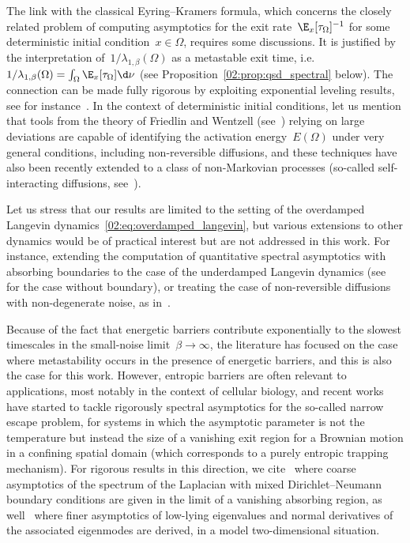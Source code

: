     The link with the classical Eyring--Kramers formula, which concerns the closely related problem of computing asymptotics for the exit rate~$\E_x[\tau_\Omega]^{-1}$ for some deterministic initial condition~$x\in\Omega$, requires some discussions. It is justified by the interpretation of~$1/\lambda_{1,\beta}(\Omega)$ as a metastable exit time, i.e.~$1/\lambda_{1,\beta}(\Omega) = \int_{\Omega} \E_x[\tau_\Omega]\d \nu$ (see Proposition~\ref{02:prop:qsd_spectral} below). The connection can be made fully rigorous by exploiting exponential leveling results, see for instance~\cite{N20}.
    In the context of deterministic initial conditions, let us mention that tools from the theory of Friedlin and Wentzell (see~\cite{FW12}) relying on large deviations are capable of identifying the activation energy~$E(\Omega)$ under very general conditions, including non-reversible diffusions, and these techniques have also been recently extended to a class of non-Markovian processes (so-called self-interacting diffusions, see~\cite{ADMKT24}).

    Let us stress that our results are limited to the setting of the overdamped Langevin dynamics~\eqref{02:eq:overdamped_langevin}, but various extensions to other dynamics would be of practical interest but are not addressed in this work. For instance, extending the computation of quantitative spectral asymptotics with absorbing boundaries to the case of the underdamped Langevin dynamics (see~\cite{HHS08a,HHS08b,HHS11,BLPM24} for the case without boundary), or treating the case of non-reversible diffusions with non-degenerate noise, as in~\cite{BR16,LMS19,LPM20,LS22}.

    Because of the fact that energetic barriers contribute exponentially to the slowest timescales in the small-noise limit~$\beta\to\infty$, the literature has focused on the case where metastability occurs in the presence of energetic barriers, and this is also the case for this work.
    However, entropic barriers are often relevant to applications, most notably in the context of cellular biology, and recent works have started to tackle rigorously spectral asymptotics for the so-called narrow escape problem, for systems in which the asymptotic parameter is not the temperature but instead the size of a vanishing exit region for a Brownian motion in a confining spatial domain (which corresponds to a purely entropic trapping mechanism).
    For rigorous results in this direction, we cite~\cite{FNO21} where coarse asymptotics of the spectrum of the Laplacian with mixed Dirichlet--Neumann boundary conditions are given in the limit of a vanishing absorbing region, as well~\cite{AKKL12,LRS24} where finer asymptotics of low-lying eigenvalues and normal derivatives of the associated eigenmodes are derived, in a model two-dimensional situation.

